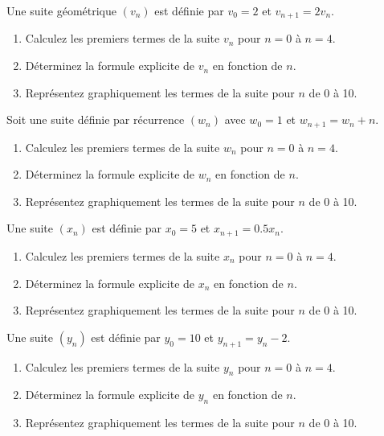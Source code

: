 \documentclass[12pt,a4paper,french]{book}
\begin{document}
\begin{exocor}
Une suite géométrique $(v_n)$ est définie par $v_0 = 2$ et $v_{n+1} = 2v_n$.

\begin{enumerate}
    \item Calculez les premiers termes de la suite $v_n$ pour $n = 0$ à $n = 4$.
    \item Déterminez la formule explicite de $v_n$ en fonction de $n$.
    \item Représentez graphiquement les termes de la suite pour $n$ de 0 à 10.
\end{enumerate}
\end{exocor}

\begin{exocor}
Soit une suite définie par récurrence $(w_n)$ avec $w_0 = 1$ et $w_{n+1} = w_n + n$.

\begin{enumerate}
    \item Calculez les premiers termes de la suite $w_n$ pour $n = 0$ à $n = 4$.
    \item Déterminez la formule explicite de $w_n$ en fonction de $n$.
    \item Représentez graphiquement les termes de la suite pour $n$ de 0 à 10.
\end{enumerate}
\end{exocor}

\begin{exocor}
Une suite $(x_n)$ est définie par $x_0 = 5$ et $x_{n+1} = 0.5x_n$.

\begin{enumerate}
    \item Calculez les premiers termes de la suite $x_n$ pour $n = 0$ à $n = 4$.
    \item Déterminez la formule explicite de $x_n$ en fonction de $n$.
    \item Représentez graphiquement les termes de la suite pour $n$ de 0 à 10.
\end{enumerate}
\end{exocor}

\begin{exocor}
Une suite $(y_n)$ est définie par $y_0 = 10$ et $y_{n+1} = y_n - 2$.

\begin{enumerate}
    \item Calculez les premiers termes de la suite $y_n$ pour $n = 0$ à $n = 4$.
    \item Déterminez la formule explicite de $y_n$ en fonction de $n$.
    \item Représentez graphiquement les termes de la suite pour $n$ de 0 à 10.
\end{enumerate}
\end{exocor}
\end{document}

